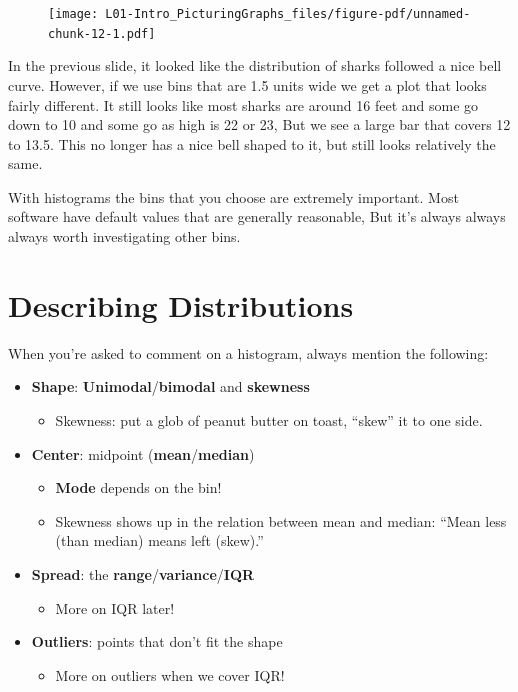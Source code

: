 \documentclass[
  letterpaper,
  DIV=11,
  numbers=noendperiod]{scrreprt}
\providecommand{\tightlist}{%
  \setlength{\itemsep}{0pt}\setlength{\parskip}{0pt}}\usepackage{longtable,booktabs,array}
\begin{document}
\begin{figure}[H]

{\centering \texttt{[image: L01-Intro\_PicturingGraphs\_files/figure-pdf/unnamed-chunk-12-1.pdf]}

}

\end{figure}

In the previous slide, it looked like the distribution of sharks
followed a nice bell curve. However, if we use bins that are 1.5 units
wide we get a plot that looks fairly different. It still looks like most
sharks are around 16 feet and some go down to 10 and some go as high is
22 or 23, But we see a large bar that covers 12 to 13.5. This no longer
has a nice bell shaped to it, but still looks relatively the same.

With histograms the bins that you choose are extremely important. Most
software have default values that are generally reasonable, But it's
always always always worth investigating other bins.

\hypertarget{describing-distributions}{%
\section{Describing Distributions}\label{describing-distributions}}

When you're asked to comment on a histogram, always mention the
following:

\begin{itemize}
\tightlist
\item
  \textbf{Shape}: \textbf{Unimodal}/\textbf{bimodal} and
  \textbf{skewness}

  \begin{itemize}
  \tightlist
  \item
    Skewness: put a glob of peanut butter on toast, ``skew'' it to one
    side.\lspace
  \end{itemize}
\item
  \textbf{Center}: midpoint (\textbf{mean}/\textbf{median})

  \begin{itemize}
  \tightlist
  \item
    \textbf{Mode} depends on the bin!
  \item
    Skewness shows up in the relation between mean and median: ``Mean
    less (than median) means left (skew).''\lspace
  \end{itemize}
\item
  \textbf{Spread}: the
  \textbf{range}/\textbf{variance}/\textbf{IQR}\lspace

  \begin{itemize}
  \tightlist
  \item
    More on IQR later!\lspace
  \end{itemize}
\item
  \textbf{Outliers}: points that don't fit the shape

  \begin{itemize}
  \tightlist
  \item
    More on outliers when we cover IQR!
  \end{itemize}
\end{itemize}
\end{document}
